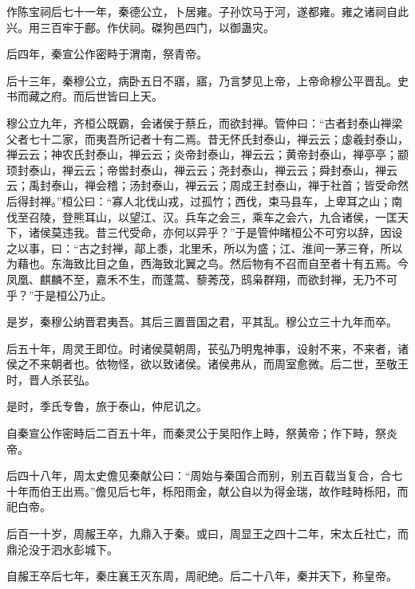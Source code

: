 \documentclass[12pt,UTF8]{ctexbook}
\begin{document}
作陈宝祠后七十一年，秦德公立，卜居雍。子孙饮马于河，遂都雍。雍之诸祠自此兴。用三百牢于鄜。作伏祠。磔狗邑四门，以御蛊灾。



后四年，秦宣公作密畤于渭南，祭青帝。



后十三年，秦穆公立，病卧五日不寤，寤，乃言梦见上帝，上帝命穆公平晋乱。史书而藏之府。而后世皆曰上天。



穆公立九年，齐桓公既霸，会诸侯于蔡丘，而欲封禅。管仲曰：“古者封泰山禅梁父者七十二家，而夷吾所记者十有二焉。昔无怀氏封泰山，禅云云；虙羲封泰山，禅云云；神农氏封泰山，禅云云；炎帝封泰山，禅云云；黄帝封泰山，禅亭亭；颛顼封泰山，禅云云；帝喾封泰山，禅云云；尧封泰山，禅云云；舜封泰山，禅云云；禹封泰山，禅会稽；汤封泰山，禅云云；周成王封泰山，禅于社首；皆受命然后得封禅。”桓公曰：“寡人北伐山戎，过孤竹；西伐，束马县车，上卑耳之山；南伐至召陵，登熊耳山，以望江、汉。兵车之会三，乘车之会六，九合诸侯，一匡天下，诸侯莫违我。昔三代受命，亦何以异乎？”于是管仲睹桓公不可穷以辞，因设之以事，曰：“古之封禅，鄗上黍，北里禾，所以为盛；江、淮间一茅三脊，所以为藉也。东海致比目之鱼，西海致北翼之鸟。然后物有不召而自至者十有五焉。今凤凰、麒麟不至，嘉禾不生，而蓬蒿、藜莠茂，鸱枭群翔，而欲封禅，无乃不可乎？”于是桓公乃止。



是岁，秦穆公纳晋君夷吾。其后三置晋国之君，平其乱。穆公立三十九年而卒。



后五十年，周灵王即位。时诸侯莫朝周，苌弘乃明鬼神事，设射不来，不来者，诸侯之不来朝者也。依物怪，欲以致诸侯。诸侯弗从，而周室愈微。后二世，至敬王时，晋人杀苌弘。



是时，季氏专鲁，旅于泰山，仲尼讥之。



自秦宣公作密畤后二百五十年，而秦灵公于吴阳作上畤，祭黄帝；作下畤，祭炎帝。



后四十八年，周太史儋见秦献公曰：“周始与秦国合而别，别五百载当复合，合七十年而伯王出焉。”儋见后七年，栎阳雨金，献公自以为得金瑞，故作畦畤栎阳，而祀白帝。



后百一十岁，周赧王卒，九鼎入于秦。或曰，周显王之四十二年，宋太丘社亡，而鼎沦没于泗水彭城下。



自赧王卒后七年，秦庄襄王灭东周，周祀绝。后二十八年，秦并天下，称皇帝。
\end{document}
